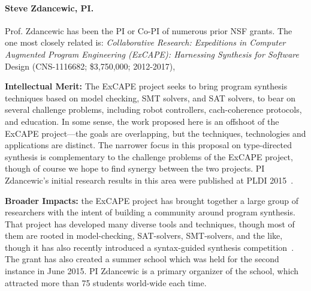\paragraph{Steve Zdancewic, PI.}  

Prof. Zdancewic has been the PI or Co-PI of numerous prior NSF
grants. The one most closely related is:
\emph{Collaborative Research: Expeditions in Computer Augmented
  Program Engineering (ExCAPE): Harnessing Synthesis for Software}
  Design (CNS-1116682; \$3,750,000; 2012-2017),

  {\bf Intellectual Merit:} The ExCAPE project seeks to bring program
  synthesis techniques based on model checking, SMT solvers, and SAT
  solvers, to bear on several challenge problems, including robot
  controllers, cach-coherence protocols, and education. In some sense,
  the work proposed here is an offshoot of the ExCAPE project---the
  goals are overlapping, but the techniques, technologies and applications are
  distinct. The narrower focus in this proposal on type-directed
  synthesis is complementary to the challenge problems of
  the ExCAPE project, though of course we hope to find synergy between
  the two projects.  PI Zdancewic's initial research results in this area 
  were published at PLDI 2015~\cite{OZ15}.

  {\bf Broader Impacts:} the ExCAPE project has brought together a
  large group of researchers with the intent of building a community
  around program synthesis.  That project has developed many diverse
  tools and techniques, though most of them are rooted in
  model-checking, SAT-solvers, SMT-solvers, and the like, though it
  has also recently introduced a syntax-guided synthesis
  competition~\cite{alur-fmcad-2013}.  The grant has also created a
  summer school which was held for the second instance in June
  2015.  PI Zdancewic is a primary organizer of the school, which
  attracted more than 75 students world-wide each time.



